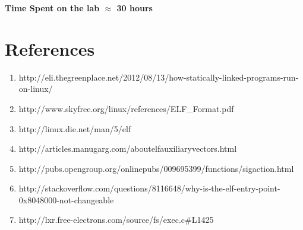 \documentclass[10pt] {article}
\begin{document}
\vfill

\noindent \textbf{Time Spent on the lab \ensuremath{\approx} 30 hours} 

\section{References}
\begin{enumerate}
  \item http://eli.thegreenplace.net/2012/08/13/how-statically-linked-programs-run-on-linux/
  \item http://www.skyfree.org/linux/references/ELF\_Format.pdf
  \item http://linux.die.net/man/5/elf
  \item http://articles.manugarg.com/aboutelfauxiliaryvectors.html
  \item  http://pubs.opengroup.org/onlinepubs/009695399/functions/sigaction.html
  \item http://stackoverflow.com/questions/8116648/why-is-the-elf-entry-point-0x8048000-not-changeable
  \item http://lxr.free-electrons.com/source/fs/exec.c\#L1425
\end{enumerate}
\end{document}
